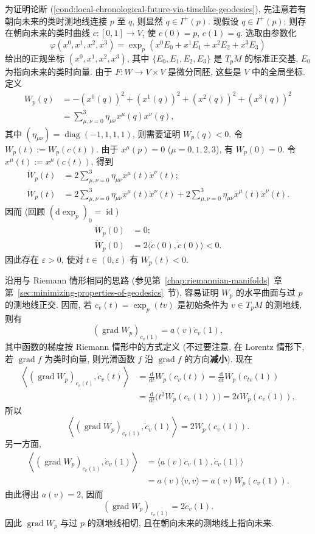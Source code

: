 \begin{RiemannProof}
为证明论断 (\ref{cond:local-chronological-future-via-timelike-geodesics}), 先注意若有朝向未来的类时测地线连接 $p$ 至 $q$, 则显然 $q\in I^+(p)$. 现假设 $q\in I^+(p)$; 则存在朝向未来的类时曲线 $c:[0,1]\to V$, 使 $c(0)=p$, $c(1)=q$. 选取由参数化
\[
  \varphi(x^0,x^1,x^2,x^3)=\exp_p(x^0E_0+x^1E_1+x^2E_2+x^3E_3)
\]
给出的正规坐标 $(x^0,x^1,x^2,x^3)$, 其中 $\{E_0,E_1,E_2,E_3\}$ 是 $T_pM$ 的标准正交基, $E_0$ 为指向未来的类时向量. 由于 $F:W\to V\times V$ 是微分同胚, 这些是 $V$ 中的全局坐标. 定义
\begin{align*}
  W_p(q)&=-(x^0(q))^2+(x^1(q))^2+(x^2(q))^2+(x^3(q))^2\\
        &=\sum_{\mu,\nu=0}^3\eta_{\mu\nu}x^\mu(q)x^\nu(q),
\end{align*}
其中 $(\eta_{\mu\nu})=\operatorname{diag}(-1,1,1,1)$, 则需要证明 $W_p(q)<0$. 令 $W_p(t):=W_p(c(t))$. 由于 $x^\mu(p)=0$ ($\mu=0,1,2,3$), 有 $W_p(0)=0$. 令 $x^\mu(t):=x^\mu(c(t))$, 得到
\begin{align*}
  \dot W_p(t)&=2\sum_{\mu,\nu=0}^3\eta_{\mu\nu}x^\mu(t)\dot x^\nu(t);\\
  \ddot W_p(t)&=2\sum_{\mu,\nu=0}^3\eta_{\mu\nu}x^\mu(t)\ddot x^\nu(t)
               +2\sum_{\mu,\nu=0}^3\eta_{\mu\nu}\dot x^\mu(t)\dot x^\nu(t).
\end{align*}
因而 (回顾 $(\mathrm{d}\exp_p)_0=\operatorname{id}$)
\begin{align*}
  \dot W_p(0)&=0;\\
  \ddot W_p(0)&=2\langle\dot c(0),\dot c(0)\rangle<0.
\end{align*}
因此存在 $\varepsilon>0$, 使对 $t\in(0,\varepsilon)$ 有 $W_p(t)<0$.

沿用与 Riemann 情形相同的思路 (参见第~\ref{chap:riemannian-manifolds}~章第~\ref{sec:minimizing-properties-of-geodesics}~节), 容易证明 $W_p$ 的水平曲面与过 $p$ 的测地线正交. 因而, 若 $c_v(t)=\exp_p(tv)$ 是初始条件为 $v\in T_pM$ 的测地线, 则有
\[
  (\operatorname{grad}W_p)_{c_v(1)}=a(v)\dot c_v(1),
\]
其中函数的梯度按 Riemann 情形中的方式定义 (不过要注意, 在 Lorentz 情形下, 若 $\operatorname{grad}f$ 为类时向量, 则光滑函数 $f$ 沿 $\operatorname{grad}f$ 的方向\textbf{减小}). 现在
\begin{align*}
  \left\langle(\operatorname{grad}W_p)_{c_v(t)},\dot c_v(t)\right\rangle
     &=\frac{\mathrm{d}}{\mathrm{d}t}W_p(c_v(t))
       =\frac{\mathrm{d}}{\mathrm{d}t}W_p(c_{tv}(1))\\
     &=\frac{\mathrm{d}}{\mathrm{d}t}\bigl(t^2W_p(c_v(1))\bigr)=2tW_p(c_v(1)),
\end{align*}
所以
\[
  \left\langle(\operatorname{grad}W_p)_{c_v(1)},\dot c_v(1)\right\rangle
     =2W_p(c_v(1)).
\]
另一方面,
\begin{align*}
  \left\langle(\operatorname{grad}W_p)_{c_v(1)},\dot c_v(1)\right\rangle
    &=\langle a(v)\dot c_v(1),\dot c_v(1)\rangle\\
    &=a(v)\langle v,v\rangle=a(v)W_p(c_v(1)).
\end{align*}
由此得出 $a(v)=2$, 因而
\[
  (\operatorname{grad}W_p)_{c_v(1)}=2\dot c_v(1).
\]
因此 $\operatorname{grad}W_p$ 与过 $p$ 的测地线相切, 且在朝向未来的测地线上指向未来.


\end{RiemannProof}
